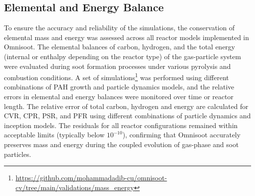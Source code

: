 \subsection{Elemental and Energy Balance}
\noindent To ensure the accuracy and reliability of the simulations, the conservation of elemental mass and energy was assessed across all reactor models implemented in Omnisoot. The elemental balances of carbon, hydrogen, and the total energy (internal or enthalpy depending on the reactor type) of the gas-particle system were evaluated during soot formation processes under various pyrolysis and combustion conditions.
A set of simulations\footnote{\href{https://github.com/mohammadadib-cu/omnisoot-cv/tree/main/validations/mass_energy}{https://github.com/mohammadadib-cu/omnisoot-cv/tree/main/validations/mass\_energy}} was performed using different combinations of PAH growth and particle dynamics models, and the relative errors in elemental and energy balances were monitored over time or reactor length. The relative error of total carbon, hydrogen and energy are calculated for CVR, CPR, PSR, and PFR using different combinations of particle dynamics and inception models. The residuals for all reactor configurations remained within acceptable limits (typically below $10^{-10}$), confirming that Omnisoot accurately preserves mass and energy during the coupled evolution of gas-phase and soot particles. 


